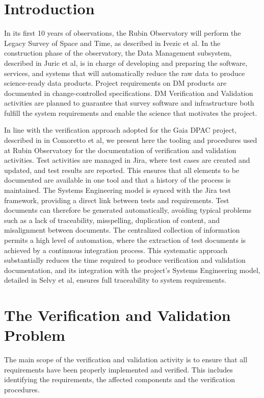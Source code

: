 \section{Introduction}

In its first 10 years of observations, the Rubin Observatory will perform the Legacy Survey of Space and Time, as described
in Ivezic et al\cite{2019ApJ...873..111I}. In the construction phase of the observatory, the Data Management subsystem,
described in Juric et al\cite{2015arXiv151207914J}, is in charge of developing and preparing the
software, services, and systems that will automatically reduce the raw data to produce science-ready data products.
Project requirements on DM products are documented in change-controlled specifications. DM Verification and Validation activities
are planned to guarantee that survey software and infrastructure both fulfill the system requirements
and enable the science that motivates the project.

In line with the verification approach adopted for the Gaia DPAC project, described in in Comoretto et al\cite{10.1117/12.926797},
we present here the tooling and procedures used at Rubin Observatory for the documentation of verification and
validation activities. Test activities are managed in Jira, where test cases are created and updated, and test results
are reported. This ensures that all elements to be documented are available in one tool and that a history of
the process is maintained. The Systems Engineering model is synced with the Jira test framework, providing a direct link between
tests and requirements. Test documents can therefore be generated automatically, avoiding typical problems
such as a lack of traceability, misspelling, duplication of content, and misalignment between documents. The
centralized collection of information permits a high level of automation, where the extraction of test documents is
achieved by a continuous integration process. This systematic approach substantially reduces the time required to
produce verification and validation documentation, and its integration with the project's Systems Engineering model,
detailed in Selvy et al\cite{10.1117/12.2310125}, ensures full traceability to system requirements.


\section{The Verification and Validation Problem}
\label{sec:vandvproblem}

The main scope of the verification and validation activity is to ensure that all requirements have been properly implemented and verified.
This includes identifying the requirements, the affected components and the verification procedures.

